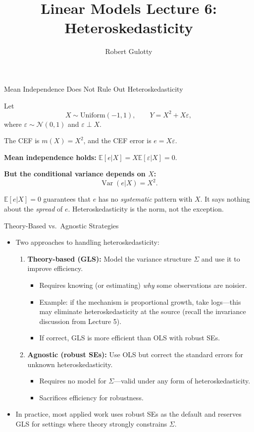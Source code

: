 \documentclass[aspectratio=169, handout, t]{beamer}
\title[PLSC 30700]{Linear Models Lecture 6: Heteroskedasticity}
\author{Robert Gulotty}
\institute[Chicago]{University of Chicago}
\numberwithin{equation}{section}
\begin{document}
\begin{frame}
\maketitle
\end{frame}

\begin{frame}{Mean Independence Does Not Rule Out Heteroskedasticity}

Let
\[
X \sim \text{Uniform}(-1,1),
\qquad
Y = X^2 + X\varepsilon,
\]
where $\varepsilon \sim \mathcal{N}(0,1)$ and $\varepsilon \perp X$.

\medskip

The CEF is $m(X)=X^2$, and the CEF error is $e = X\varepsilon$.

\medskip
\textbf{Mean independence holds:}\quad
$\mathbb{E}[e|X]
= X\mathbb{E}[\varepsilon|X]
= 0.$

\medskip\pause
\textbf{But the conditional variance depends on $X$:}
\[
\operatorname{Var}(e|X)
= X^2.
\]

\pause
\medskip
\begin{tcolorbox}[colback=blue!5, colframe=blue!50]
$\mathbb{E}[e|X]=0$ guarantees that $e$ has no \emph{systematic} pattern with $X$.  It says nothing about the \emph{spread} of $e$.  Heteroskedasticity is the norm, not the exception.
\end{tcolorbox}
\end{frame}

\begin{frame}{Theory-Based vs.\ Agnostic Strategies}
\begin{itemize}
\item Two approaches to handling heteroskedasticity:\pause
\begin{enumerate}
\item \textbf{Theory-based (GLS):} Model the variance structure $\Sigma$ and use it to improve efficiency.
\begin{itemize}
\item Requires knowing (or estimating) \emph{why} some observations are noisier.
\item Example: if the mechanism is proportional growth, take logs---this may eliminate heteroskedasticity at the source (recall the invariance discussion from Lecture 5).
\item If correct, GLS is more efficient than OLS with robust SEs.
\end{itemize}\pause
\item \textbf{Agnostic (robust SEs):} Use OLS but correct the standard errors for unknown heteroskedasticity.
\begin{itemize}
\item Requires no model for $\Sigma$---valid under any form of heteroskedasticity.
\item Sacrifices efficiency for robustness.
\end{itemize}
\end{enumerate}\pause
\item In practice, most applied work uses robust SEs as the default and reserves GLS for settings where theory strongly constrains $\Sigma$.
\end{itemize}
\end{frame}
\end{document}
